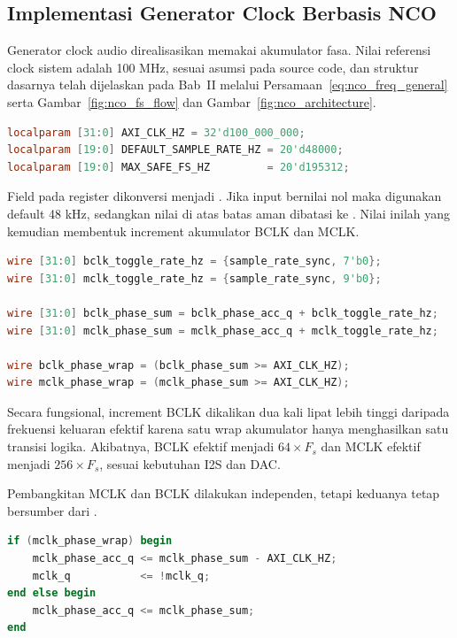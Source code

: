 \subsection{Implementasi Generator Clock Berbasis NCO}

Generator clock audio direalisasikan memakai akumulator fasa. Nilai referensi clock sistem adalah 100 MHz, sesuai asumsi pada source code, dan struktur dasarnya telah dijelaskan pada Bab~II melalui Persamaan~\eqref{eq:nco_freq_general} serta Gambar~\ref{fig:nco_fs_flow} dan Gambar~\ref{fig:nco_architecture}.

\begin{lstlisting}[language=Verilog,caption={Parameter clock sistem dan batas sample rate.},label={lst:ch4-clock-param}]
localparam [31:0] AXI_CLK_HZ = 32'd100_000_000;
localparam [19:0] DEFAULT_SAMPLE_RATE_HZ = 20'd48000;
localparam [19:0] MAX_SAFE_FS_HZ         = 20'd195312;
\end{lstlisting}

Field  pada register  dikonversi menjadi . Jika input bernilai nol maka digunakan default 48 kHz, sedangkan nilai di atas batas aman dibatasi ke . Nilai inilah yang kemudian membentuk increment akumulator BCLK dan MCLK.

\begin{lstlisting}[language=Verilog,caption={Pembentukan increment akumulator BCLK dan MCLK.},label={lst:ch4-nco-increment}]
wire [31:0] bclk_toggle_rate_hz = {sample_rate_sync, 7'b0};
wire [31:0] mclk_toggle_rate_hz = {sample_rate_sync, 9'b0};

wire [31:0] bclk_phase_sum = bclk_phase_acc_q + bclk_toggle_rate_hz;
wire [31:0] mclk_phase_sum = mclk_phase_acc_q + mclk_toggle_rate_hz;

wire bclk_phase_wrap = (bclk_phase_sum >= AXI_CLK_HZ);
wire mclk_phase_wrap = (mclk_phase_sum >= AXI_CLK_HZ);
\end{lstlisting}

Secara fungsional, increment BCLK dikalikan dua kali lipat lebih tinggi daripada frekuensi keluaran efektif karena satu wrap akumulator hanya menghasilkan satu transisi logika. Akibatnya, BCLK efektif menjadi $64 \times F_s$ dan MCLK efektif menjadi $256 \times F_s$, sesuai kebutuhan I2S dan DAC.

Pembangkitan MCLK dan BCLK dilakukan independen, tetapi keduanya tetap bersumber dari .

\begin{lstlisting}[language=Verilog,caption={Toggle MCLK berbasis wrap akumulator.},label={lst:ch4-mclk}]
if (mclk_phase_wrap) begin
    mclk_phase_acc_q <= mclk_phase_sum - AXI_CLK_HZ;
    mclk_q           <= !mclk_q;
end else begin
    mclk_phase_acc_q <= mclk_phase_sum;
end
\end{lstlisting}

